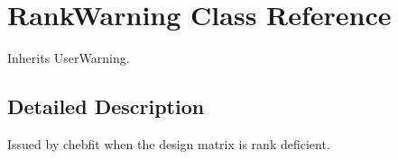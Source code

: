 \hypertarget{classpyneb_1_1utils_1_1polyutils_1_1_rank_warning}{\section{Rank\-Warning Class Reference}
\label{classpyneb_1_1utils_1_1polyutils_1_1_rank_warning}
}


Inherits User\-Warning.



\subsection{Detailed Description}
\begin{DoxyVerb}Issued by chebfit when the design matrix is rank deficient.\end{DoxyVerb}
 